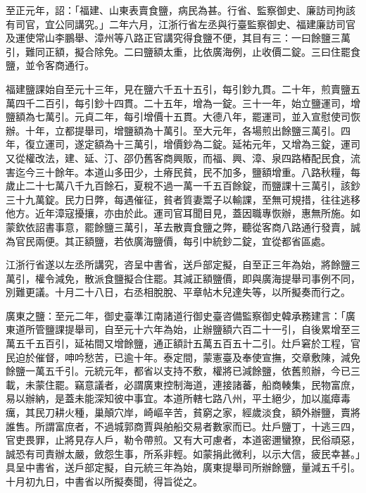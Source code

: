 \begin{pinyinscope}
 至正元年，詔：「福建、山東表賣食鹽，病民為甚。行省、監察御史、廉訪司拘該有司官，宜公同講究。」二年六月，江浙行省左丞與行臺監察御史、福建廉訪司官及運使常山李鵬舉、漳州等八路正官講究得食鹽不便，其目有三：一曰餘鹽三萬引，難同正額，擬合除免。二曰鹽額太重，比依廣海例，止收價二錠。三曰住罷食鹽，並令客商通行。



 福建鹽課始自至元十三年，見在鹽六千五十五引，每引鈔九貫。二十年，煎賣鹽五萬四千二百引，每引鈔十四貫。二十五年，增為一錠。三十一年，始立鹽運司，增鹽額為七萬引。元貞二年，每引增價十五貫。大德八年，罷運司，並入宣慰使司恢辦。十年，立都提舉司，增鹽額為十萬引。至大元年，各場煎出餘鹽三萬引。四年，復立運司，遂定額為十三萬引，增價鈔為二錠。延祐元年，又增為三錠，運司又從權改法，建、延、汀、邵仍舊客商興販，而福、興、漳、泉四路樁配民食，流害迄今三十餘年。本道山多田少，土瘠民貧，民不加多，鹽額增重。八路秋糧，每歲止二十七萬八千九百餘石，夏稅不過一萬一千五百餘錠，而鹽課十三萬引，該鈔三十九萬錠。民力日弊，每遇催征，貧者質妻鬻子以輸課，至無可規措，往往逃移他方。近年漳寇擾攘，亦由於此。運司官耳聞目見，蓋因職專恢辦，惠無所施。如蒙欽依詔書事意，罷餘鹽三萬引，革去散賣食鹽之弊，聽從客商八路通行發賣，誠為官民兩便。其正額鹽，若依廣海鹽價，每引中統鈔二錠，宜從都省區處。



 江浙行省遂以左丞所講究，咨呈中書省，送戶部定擬，自至正三年為始，將餘鹽三萬引，權令減免，散派食鹽擬合住罷。其減正額鹽價，即與廣海提舉司事例不同，別難更議。十月二十八日，右丞相脫脫、平章帖木兒達失等，以所擬奏而行之。



 廣東之鹽：至元二年，御史臺準江南諸道行御史臺咨備監察御史韓承務建言：「廣東道所管鹽課提舉司，自至元十六年為始，止辦鹽額六百二十一引，自後累增至三萬五千五百引，延祐間又增餘鹽，通正額計五萬五百五十二引。灶戶窘於工程，官民迫於催督，呻吟愁苦，已逾十年。泰定間，蒙憲臺及奉使宣撫，交章敷陳，減免餘鹽一萬五千引。元統元年，都省以支持不敷，權將已減餘鹽，依舊煎辦，今已三載，未蒙住罷。竊意議者，必謂廣東控制海道，連接諸蕃，船商輳集，民物富庶，易以辦納，是蓋未能深知彼中事宜。本道所轄七路八州，平土絕少，加以嵐瘴毒癘，其民刀耕火種，巢顛穴岸，崎嶇辛苦，貧窮之家，經歲淡食，額外辦鹽，賣將誰售。所謂富庶者，不過城郭商賈與舶船交易者數家而已。灶戶鹽丁，十逃三四，官吏畏罪，止將見存人戶，勒令帶煎。又有大可慮者，本道密邇蠻獠，民俗頑惡，誠恐有司責辦太嚴，斂怨生事，所系非輕。如蒙捐此微利，以示大信，疲民幸甚。」具呈中書省，送戶部定擬，自元統三年為始，廣東提舉司所辦餘鹽，量減五千引。十月初九日，中書省以所擬奏聞，得旨從之。




\end{pinyinscope}
